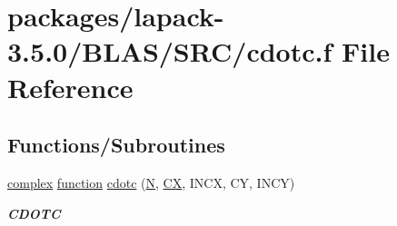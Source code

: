 \hypertarget{lapack-3_85_80_2BLAS_2SRC_2cdotc_8f}{}\section{packages/lapack-\/3.5.0/\+B\+L\+A\+S/\+S\+R\+C/cdotc.f File Reference}
\label{lapack-3_85_80_2BLAS_2SRC_2cdotc_8f}
\subsection*{Functions/\+Subroutines}
\begin{DoxyCompactItemize}
\item 
\hyperlink{structcomplex}{complex} \hyperlink{afunc_8m_a7b5e596df91eadea6c537c0825e894a7}{function} \hyperlink{group__complex__blas__level1_ga0f02c96fa8498b4aa6b144deee725c0d}{cdotc} (\hyperlink{polmisc_8c_a0240ac851181b84ac374872dc5434ee4}{N}, \hyperlink{scsum1_8c_a5a76da95c549c41790389a76e12fdcb5}{C\+X}, I\+N\+C\+X, C\+Y, I\+N\+C\+Y)
\begin{DoxyCompactList}\small\item\em {\bfseries C\+D\+O\+T\+C} \end{DoxyCompactList}\end{DoxyCompactItemize}
